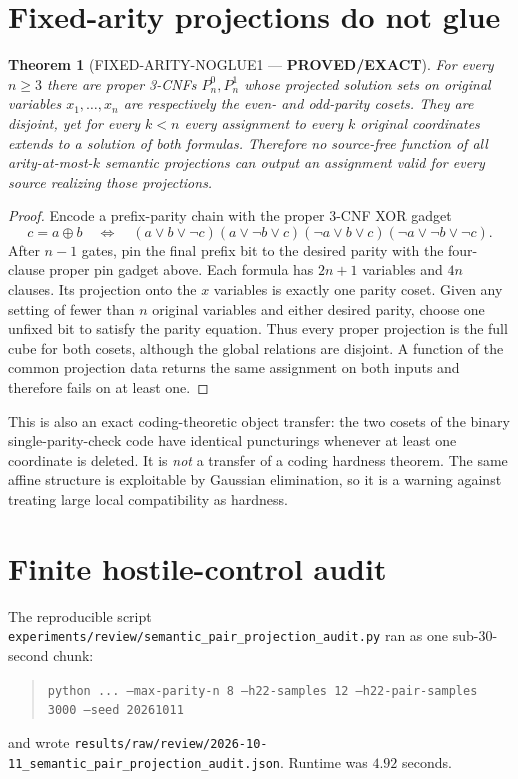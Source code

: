 \documentclass[11pt]{article}
\newtheorem{theorem}{Theorem}
\newcommand{\status}[1]{\textbf{#1}}
\begin{document}
\section{Fixed-arity projections do not glue}
\begin{theorem}[FIXED-ARITY-NOGLUE1 --- \status{PROVED/EXACT}]
For every $n\ge 3$ there are proper 3-CNFs $P_n^0,P_n^1$ whose projected solution sets on original variables $x_1,\dots,x_n$ are respectively the even- and odd-parity cosets.  They are disjoint, yet for every $k<n$ every assignment to every $k$ original coordinates extends to a solution of both formulas.  Therefore no source-free function of all arity-at-most-$k$ semantic projections can output an assignment valid for every source realizing those projections.
\end{theorem}
\begin{proof}
Encode a prefix-parity chain with the proper 3-CNF XOR gadget
\[
c=a\oplus b\quad\Longleftrightarrow\quad
(a\vee b\vee\neg c)(a\vee\neg b\vee c)
(\neg a\vee b\vee c)(\neg a\vee\neg b\vee\neg c).
\]
After $n-1$ gates, pin the final prefix bit to the desired parity with the four-clause proper pin gadget above.  Each formula has $2n+1$ variables and $4n$ clauses.  Its projection onto the $x$ variables is exactly one parity coset.  Given any setting of fewer than $n$ original variables and either desired parity, choose one unfixed bit to satisfy the parity equation.  Thus every proper projection is the full cube for both cosets, although the global relations are disjoint.  A function of the common projection data returns the same assignment on both inputs and therefore fails on at least one.
\end{proof}

This is also an exact coding-theoretic object transfer: the two cosets of the binary single-parity-check code have identical puncturings whenever at least one coordinate is deleted.  It is \emph{not} a transfer of a coding hardness theorem.  The same affine structure is exploitable by Gaussian elimination, so it is a warning against treating large local compatibility as hardness.

\section{Finite hostile-control audit}
The reproducible script
\texttt{experiments/review/semantic\_pair\_projection\_audit.py} ran as one sub-30-second chunk:
\begin{quote}\small
\texttt{python ... --max-parity-n 8 --h22-samples 12 --h22-pair-samples 3000 --seed 20261011}
\end{quote}
and wrote \texttt{results/raw/review/2026-10-11\_semantic\_pair\_projection\_audit.json}.  Runtime was $4.92$ seconds.
\end{document}
